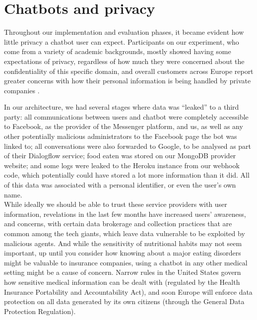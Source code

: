 \section{Chatbots and privacy}
Throughout our implementation and evaluation phases, it became evident how little privacy a chatbot user can expect. Participants on our experiment, who come from a variety of academic backgrounds, mostly showed having some expectations of privacy, regardless of how much they were concerned about the confidentiality of this specific domain, and overall customers across Europe report greater concerns with how their personal information is being handled by private companies \cite{europasurvey}. 

In our architecture, we had several stages where data was ``leaked'' to a third party: all communications between users and chatbot were completely accessible to Facebook, as the provider of the Messenger platform, and us, as well as any other potentially malicious administrators to the Facebook page the bot was linked to; all conversations were also forwarded to Google, to be analysed as part of their Dialogflow service; food eaten was stored on our MongoDB provider website; and some logs were leaked to the Heroku instance from our webhook code, which potentially could have stored a lot more information than it did. All of this data was associated with a personal identifier, or even the user's own name. \\
While ideally we should be able to trust these service providers with user information, revelations in the last few months have increased users' awareness, and concerns, with certain data brokerage and collection practices that are common among the tech giants, which leave data vulnerable to be exploited by malicious agents. And while the sensitivity of nutritional habits may not seem important, up until you consider how knowing about a major eating disorders might be valuable to insurance companies, using a chatbot in any other medical setting might be a cause of concern. Narrow rules in the United States govern how sensitive medical information can be dealt with (regulated by the Health Insurance Portability and Accountability Act), and soon Europe will enforce data protection on all data generated by its own citizens (through the General Data Protection Regulation).

